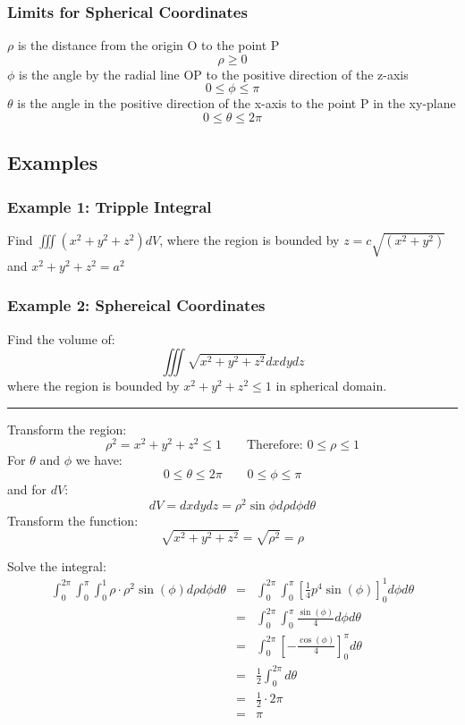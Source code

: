 \subsubsection{Limits for Spherical Coordinates}
$\rho$ is the distance from the origin O to the point P
$$\rho \geq 0$$
$\phi$ is the angle by the radial line OP to the positive direction of the z-axis
$$0\leq \phi \leq \pi$$
$\theta$ is the angle in the positive direction of the x-axis to the point P in the xy-plane
$$0\leq\theta \leq 2\pi$$

\subsection{Examples}
\subsubsection{Example 1: Tripple Integral}
Find $\iiint(x^{2}+y^{2}+z^{2})d V$, where the region is bounded by
$z=c\sqrt{(x^{2}+y^{2})}$ and $x^{2}+y^{2}+z^{2}=a^{2}$
\subsubsection{Example 2: Sphereical Coordinates}
Find the volume of:
$$\iiint\sqrt{x^2+y^2+z^2}dxdydz$$
where the region is bounded by $x^2+y^2+z^2\leq1$ in spherical domain.

\noindent\rule{\textwidth}{1pt}

Transform the region:
$$\rho^2=x^2+y^2+z^2\leq 1\qquad \text{Therefore: }0\leq\rho\leq 1$$
For $\theta$ and $\phi$ we have:
$$0\leq\theta\leq 2\pi\qquad 0\leq\phi\leq\pi$$
and for $dV$:
$$dV=dxdydz=\rho^2\sin\phi d\rho d\phi d\theta$$
Transform the function:
$$\sqrt{x^2+y^2+z^2}=\sqrt{\rho^2}=\rho$$

Solve the integral:
\begin{eqnarray*}
  \int_0^{2\pi}\int_0^\pi\int_0^1\rho\cdot\rho^2\sin(\phi) d\rho d\phi d\theta&=&\int_0^{2\pi}\int_0^\pi\left[\frac{1}{4} p^4 \sin (\phi)\right]^1_0d\phi d\theta\\
                                                                              &=& \int_0^{2\pi}\int_0^\pi\frac{\sin (\phi)}{4}d\phi d\theta\\
                                                                              &=& \int_0^{2\pi}\left[-\frac{\cos (\phi)}{4}\right]_0^\pi d\theta\\
                                                                              &=& \frac{1}{2}\int_0^{2\pi}d\theta\\
                                                                              &=& \frac{1}{2}\cdot 2\pi\\
                                                                              &=& \boxed{\pi}\\
\end{eqnarray*}

